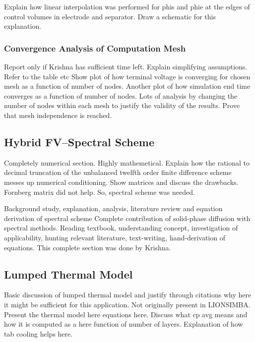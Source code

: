 Explain how  linear interpolation was performed  for phis and phie  at the edges
of  control volumes  in  electrode  and separator.  Draw  a  schematic for  this
explanation.

\subsubsection*{Convergence Analysis of Computation Mesh}
Report  only   if  Krishna  has   sufficient  time  left.   Explain  simplifying
assumptions.  Refer to  the  table etc  Show  plot of  how  terminal voltage  is
converging for chosen mesh as a function of number of nodes. Another plot of how
simulation end time converges as a function of number of nodes. Lots of analysis
by changing the number of nodes within  each mesh to justify the validity of the
results. Prove that mesh independence is reached.

\subsection{Hybrid FV--Spectral Scheme}

Completely numerical section.  Highly mathemetical. Explain how  the rational to
decimal  truncation of  the unbalanced  twelfth order  finite difference  scheme
messes  up numerical  conditioning.  Show matrices  and  discuss the  drawbacks.
Fornberg matrix did not help. So, spectral scheme was needed.

Background  study,   explanation,  analysis,  literature  review   and  equation
derivation  of spectral  scheme Complete  contribution of  solid-phase diffusion
with spectral methods. Reading textbook, understanding concept, investigation of
applicability,  hunting relevant  literature,  text-writing, hand-derivation  of
equations. This complete section was done by Krishna.

\subsection{Lumped Thermal Model}

Basic discussion of lumped thermal model  and justify through citations why here
it  might  be  sufficient  for  this  application.  Not  originally  present  in
LIONSIMBA. Present  the thermal model here  equations here. Discuss what  cp avg
means and how it is computed as a here function of number of layers. Explanation
of how tab cooling helps here.

